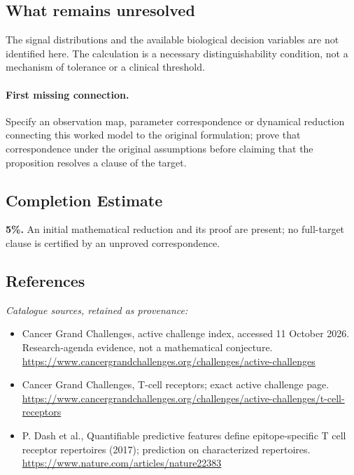 \documentclass[11pt]{article}
\begin{document}
\subsection{What remains unresolved}
The signal distributions and the available biological decision variables are not identified here. The calculation is a necessary distinguishability condition, not a mechanism of tolerance or a clinical threshold.
\paragraph{First missing connection.} Specify an observation map, parameter correspondence or dynamical reduction connecting this worked model to the original formulation; prove that correspondence under the original assumptions before claiming that the proposition resolves a clause of the target.
\subsection{Completion Estimate}
\textbf{5\%.} An initial mathematical reduction and its proof are present; no full-target clause is certified by an unproved correspondence.
\subsection{References}
\noindent\emph{Catalogue sources, retained as provenance:}
\begin{itemize}
\item Cancer Grand Challenges, active challenge index, accessed 11 October 2026. Research-agenda evidence, not a mathematical conjecture. \url{https://www.cancergrandchallenges.org/challenges/active-challenges}
\item Cancer Grand Challenges, T-cell receptors; exact active challenge page. \url{https://www.cancergrandchallenges.org/challenges/active-challenges/t-cell-receptors}
\item P. Dash et al., Quantifiable predictive features define epitope-specific T cell receptor repertoires (2017); prediction on characterized repertoires. \url{https://www.nature.com/articles/nature22383}
\end{itemize}
\clearpage


\appendix
\end{document}
